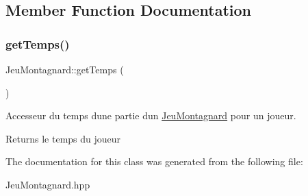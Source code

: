 \subsection{Member Function Documentation}
\mbox{\label{classJeuMontagnard_aa4934bcc49ec59f1fd922ab6466f7a9b}} 
\subsubsection{\texorpdfstring{get\+Temps()}{getTemps()}}
{\footnotesize\ttfamily Jeu\+Montagnard\+::get\+Temps (\begin{DoxyParamCaption}{ }\end{DoxyParamCaption})}



Accesseur du temps d\textquotesingle{}une partie d\textquotesingle{}un \hyperlink{classJeuMontagnard}{Jeu\+Montagnard} pour un joueur. 

\begin{DoxyReturn}{Returns}
le temps du joueur 
\end{DoxyReturn}


The documentation for this class was generated from the following file\+:\begin{DoxyCompactItemize}
\item 
Jeu\+Montagnard.\+hpp\end{DoxyCompactItemize}
